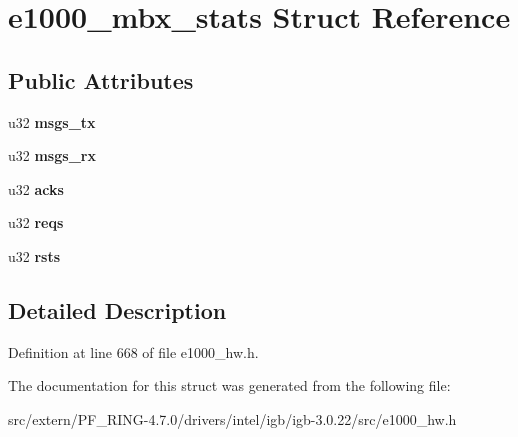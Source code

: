 \hypertarget{structe1000__mbx__stats}{
\section{e1000\_\-mbx\_\-stats Struct Reference}
\label{structe1000__mbx__stats}
}
\subsection*{Public Attributes}
\begin{DoxyCompactItemize}
\item 
\hypertarget{structe1000__mbx__stats_a9f921793d23fc9cfc0294e63d5cbb985}{
u32 {\bfseries msgs\_\-tx}}
\label{structe1000__mbx__stats_a9f921793d23fc9cfc0294e63d5cbb985}

\item 
\hypertarget{structe1000__mbx__stats_af81a5537c2edad73e9fcfd807077011e}{
u32 {\bfseries msgs\_\-rx}}
\label{structe1000__mbx__stats_af81a5537c2edad73e9fcfd807077011e}

\item 
\hypertarget{structe1000__mbx__stats_ae776ff73e983d83a76d8acda880f7973}{
u32 {\bfseries acks}}
\label{structe1000__mbx__stats_ae776ff73e983d83a76d8acda880f7973}

\item 
\hypertarget{structe1000__mbx__stats_ae72144e2da74f08d66079d68c7311f7e}{
u32 {\bfseries reqs}}
\label{structe1000__mbx__stats_ae72144e2da74f08d66079d68c7311f7e}

\item 
\hypertarget{structe1000__mbx__stats_a014578f2bc92a481b5c9bf1782d18024}{
u32 {\bfseries rsts}}
\label{structe1000__mbx__stats_a014578f2bc92a481b5c9bf1782d18024}

\end{DoxyCompactItemize}


\subsection{Detailed Description}


Definition at line 668 of file e1000\_\-hw.h.



The documentation for this struct was generated from the following file:\begin{DoxyCompactItemize}
\item 
src/extern/PF\_\-RING-\/4.7.0/drivers/intel/igb/igb-\/3.0.22/src/e1000\_\-hw.h\end{DoxyCompactItemize}
